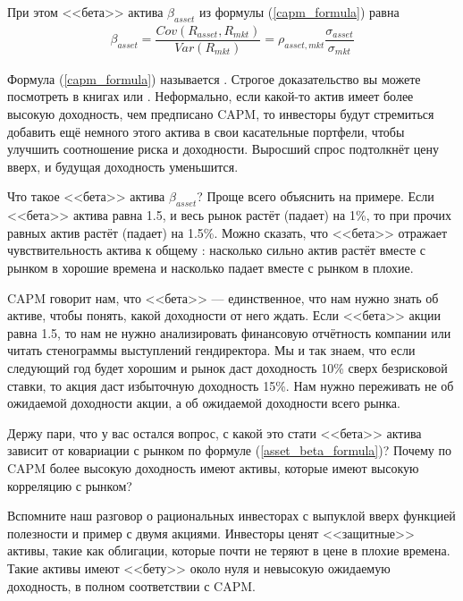 При этом <<бета>> актива $\beta_{asset}$ из формулы (\ref{capm_formula}) равна
\begin{align}
\beta_{asset} = \dfrac{Cov(R_{asset}, R_{mkt})}{Var(R_{mkt})} = \rho_{asset,mkt}\dfrac{\sigma_{asset}}{\sigma_{mkt}}
\label{asset_beta_formula}
\end{align}

Формула (\ref{capm_formula}) называется . Строгое доказательство вы можете
посмотреть в книгах \cite[p.~152]{cochrane2005asset} или \cite[ch.~9.1]
{bodie2014investments}. Неформально, если какой-то актив имеет более высокую
доходность, чем предписано CAPM, то инвесторы будут стремиться добавить ещё 
немного этого актива в свои касательные портфели, чтобы улучшить соотношение 
риска и доходности. Выросший спрос подтолкнёт цену вверх, и будущая доходность 
уменьшится.

Что такое <<бета>> актива $\beta_{asset}$? Проще всего объяснить на примере. Если <<бета>> актива равна 1.5, и весь рынок растёт (падает) на 1\%, то при прочих равных актив растёт (падает) на 1.5\%. Можно сказать, что <<бета>> отражает чувствительность актива к общему : насколько сильно актив растёт вместе с рынком в хорошие времена и насколько падает вместе с рынком в плохие.

CAPM говорит нам, что <<бета>> --- единственное, что нам нужно знать об активе, чтобы понять, какой доходности от него ждать. Если <<бета>> акции равна 1.5, то нам не нужно анализировать финансовую отчётность компании или читать стенограммы выступлений гендиректора. Мы и так знаем, что если следующий год будет хорошим и рынок даст доходность 10\% сверх безрисковой ставки, то акция даст избыточную доходность 15\%. Нам нужно переживать не об ожидаемой доходности акции, а об ожидаемой доходности всего рынка.

Держу пари, что у вас остался вопрос, с какой это стати <<бета>> актива зависит от ковариации с рынком по формуле (\ref{asset_beta_formula})? Почему по CAPM более высокую доходность имеют активы, которые имеют высокую корреляцию с рынком?

Вспомните наш разговор о рациональных инвесторах с выпуклой вверх функцией полезности и пример с двумя акциями. Инвесторы ценят <<защитные>> активы, такие как облигации, которые почти не теряют в цене в плохие времена. Такие активы имеют <<бету>> около нуля и невысокую ожидаемую доходность, в полном соответствии с CAPM.


